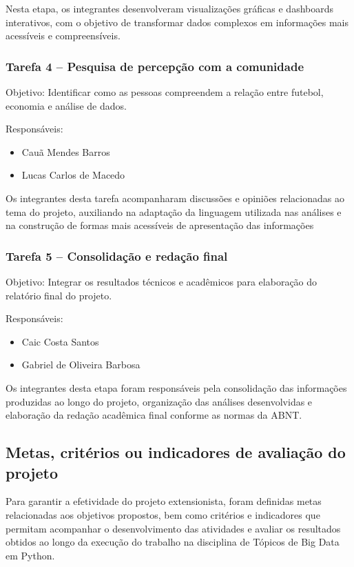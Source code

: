 \documentclass[12pt, a4paper, brazil]{article}
\begin{document}
Nesta etapa, os integrantes desenvolveram visualizações gráficas e dashboards interativos, com o objetivo de transformar dados complexos em informações mais acessíveis e compreensíveis.


\subsubsection{Tarefa 4 – Pesquisa de percepção com a comunidade}
Objetivo: Identificar como as pessoas compreendem a relação entre futebol, economia e análise de dados. \vspace{,5cm}

Responsáveis:
\begin{itemize}
    \item Cauã Mendes Barros
    \item Lucas Carlos de Macedo
\end{itemize}


Os integrantes desta tarefa acompanharam discussões e opiniões relacionadas ao tema do projeto, auxiliando na adaptação da linguagem utilizada nas análises e na construção de formas mais acessíveis de apresentação das informações

\subsubsection{Tarefa 5 – Consolidação e redação final}
Objetivo: Integrar os resultados técnicos e acadêmicos para elaboração do relatório final do projeto. \vspace{,5cm}

Responsáveis:
\begin{itemize}
    \item Caic Costa Santos
    \item Gabriel de Oliveira Barbosa
\end{itemize}


Os integrantes desta etapa foram responsáveis pela consolidação das informações produzidas ao longo do projeto, organização das análises desenvolvidas e elaboração da redação acadêmica final conforme as normas da ABNT.

\subsection{Metas, critérios ou indicadores de avaliação do projeto}

Para garantir a efetividade do projeto extensionista, foram definidas metas relacionadas aos objetivos propostos, bem como critérios e indicadores que permitam acompanhar o desenvolvimento das atividades e avaliar os resultados obtidos ao longo da execução do trabalho na disciplina de Tópicos de Big Data em Python.
\end{document}
